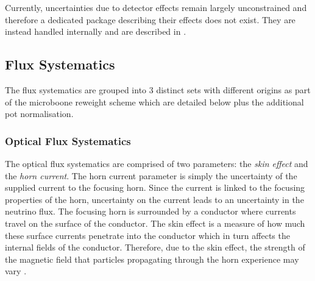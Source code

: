 Currently, uncertainties due to detector effects remain largely unconstrained and therefore a dedicated package describing their effects does not exist. They are instead handled internally and are described in . 


\subsection{Flux Systematics}\label{sec:flux_syst}

The flux systematics are grouped into 3 distinct sets with different origins as part of the \gls{microboone} reweight scheme which are detailed below plus the additional \gls{pot} normalisation. 

\subsubsection*{Optical Flux Systematics}
The optical flux systematics are comprised of two parameters: the \textit{skin effect} and the \textit{horn current}. The horn current parameter is simply the uncertainty of the supplied current to the focusing horn. Since the current is linked to the focusing properties of the horn, uncertainty on the current leads to an uncertainty in the neutrino flux. The focusing horn is surrounded by a conductor where currents travel on the surface of the conductor. The skin effect is a measure of how much these surface currents penetrate into the conductor which in turn affects the internal fields of the conductor. Therefore, due to the skin effect, the strength of the magnetic field that particles propagating through the horn experience may vary \cite{BNB_flux}.

